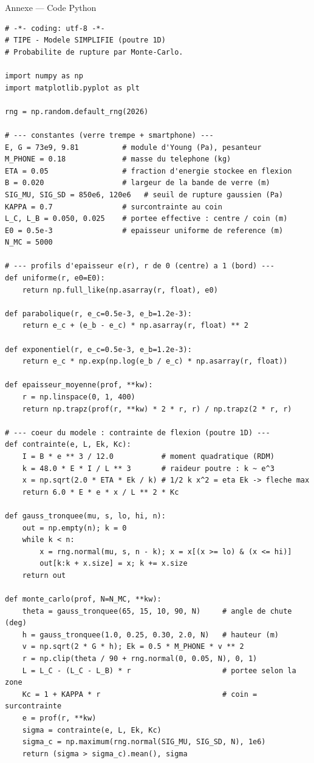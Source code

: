 \documentclass[11pt,aspectratio=169]{beamer}
\begin{document}
\begin{frame}{Annexe --- Code Python}
\tiny
\begin{verbatim}
# -*- coding: utf-8 -*-
# TIPE - Modele SIMPLIFIE (poutre 1D)
# Probabilite de rupture par Monte-Carlo.

import numpy as np
import matplotlib.pyplot as plt

rng = np.random.default_rng(2026)

# --- constantes (verre trempe + smartphone) ---
E, G = 73e9, 9.81          # module d'Young (Pa), pesanteur
M_PHONE = 0.18             # masse du telephone (kg)
ETA = 0.05                 # fraction d'energie stockee en flexion
B = 0.020                  # largeur de la bande de verre (m)
SIG_MU, SIG_SD = 850e6, 120e6   # seuil de rupture gaussien (Pa)
KAPPA = 0.7                # surcontrainte au coin
L_C, L_B = 0.050, 0.025    # portee effective : centre / coin (m)
E0 = 0.5e-3                # epaisseur uniforme de reference (m)
N_MC = 5000

# --- profils d'epaisseur e(r), r de 0 (centre) a 1 (bord) ---
def uniforme(r, e0=E0):
    return np.full_like(np.asarray(r, float), e0)

def parabolique(r, e_c=0.5e-3, e_b=1.2e-3):
    return e_c + (e_b - e_c) * np.asarray(r, float) ** 2

def exponentiel(r, e_c=0.5e-3, e_b=1.2e-3):
    return e_c * np.exp(np.log(e_b / e_c) * np.asarray(r, float))

def epaisseur_moyenne(prof, **kw):
    r = np.linspace(0, 1, 400)
    return np.trapz(prof(r, **kw) * 2 * r, r) / np.trapz(2 * r, r)

# --- coeur du modele : contrainte de flexion (poutre 1D) ---
def contrainte(e, L, Ek, Kc):
    I = B * e ** 3 / 12.0           # moment quadratique (RDM)
    k = 48.0 * E * I / L ** 3       # raideur poutre : k ~ e^3
    x = np.sqrt(2.0 * ETA * Ek / k) # 1/2 k x^2 = eta Ek -> fleche max
    return 6.0 * E * e * x / L ** 2 * Kc

def gauss_tronquee(mu, s, lo, hi, n):
    out = np.empty(n); k = 0
    while k < n:
        x = rng.normal(mu, s, n - k); x = x[(x >= lo) & (x <= hi)]
        out[k:k + x.size] = x; k += x.size
    return out

def monte_carlo(prof, N=N_MC, **kw):
    theta = gauss_tronquee(65, 15, 10, 90, N)     # angle de chute (deg)
    h = gauss_tronquee(1.0, 0.25, 0.30, 2.0, N)   # hauteur (m)
    v = np.sqrt(2 * G * h); Ek = 0.5 * M_PHONE * v ** 2
    r = np.clip(theta / 90 + rng.normal(0, 0.05, N), 0, 1)
    L = L_C - (L_C - L_B) * r                     # portee selon la zone
    Kc = 1 + KAPPA * r                            # coin = surcontrainte
    e = prof(r, **kw)
    sigma = contrainte(e, L, Ek, Kc)
    sigma_c = np.maximum(rng.normal(SIG_MU, SIG_SD, N), 1e6)
    return (sigma > sigma_c).mean(), sigma


\end{verbatim}
\end{frame}
\end{document}
